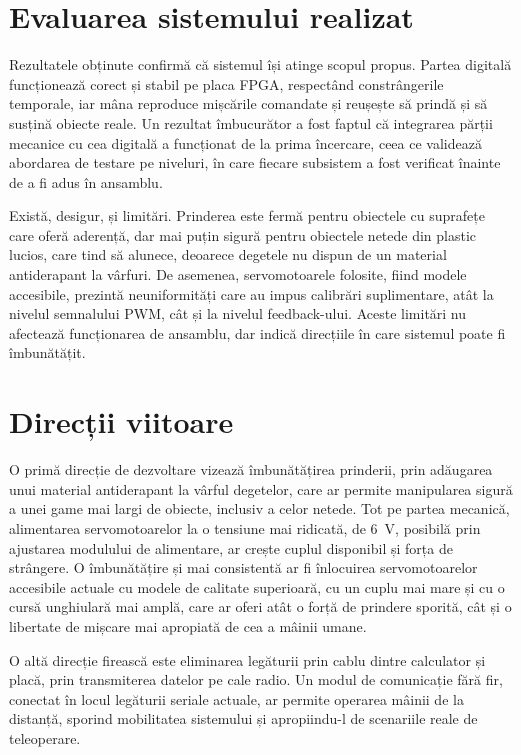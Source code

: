 \section{Evaluarea sistemului realizat}
\label{sec:concluzii-analiza}

Rezultatele obținute confirmă că sistemul își atinge scopul propus. Partea digitală
funcționează corect și stabil pe placa FPGA, respectând constrângerile temporale, iar
mâna reproduce mișcările comandate și reușește să prindă și să susțină obiecte reale.
Un rezultat îmbucurător a fost faptul că integrarea părții mecanice cu cea digitală a
funcționat de la prima încercare, ceea ce validează abordarea de testare pe niveluri,
în care fiecare subsistem a fost verificat înainte de a fi adus în ansamblu.

Există, desigur, și limitări. Prinderea este fermă pentru obiectele cu suprafețe care
oferă aderență, dar mai puțin sigură pentru obiectele netede din plastic lucios, care
tind să alunece, deoarece degetele nu dispun de un material antiderapant la vârfuri. De
asemenea, servomotoarele folosite, fiind modele accesibile, prezintă neuniformități care
au impus calibrări suplimentare, atât la nivelul semnalului PWM, cât și la nivelul
feedback-ului. Aceste limitări nu afectează funcționarea de ansamblu, dar indică
direcțiile în care sistemul poate fi îmbunătățit.

\section{Direcții viitoare}
\label{sec:concluzii-dezvoltare}

O primă direcție de dezvoltare vizează îmbunătățirea prinderii, prin adăugarea unui
material antiderapant la vârful degetelor, care ar permite manipularea sigură a unei
game mai largi de obiecte, inclusiv a celor netede. Tot pe partea mecanică, alimentarea
servomotoarelor la o tensiune mai ridicată, de 6~V, posibilă prin ajustarea modulului de
alimentare, ar crește cuplul disponibil și forța de strângere. O îmbunătățire și mai
consistentă ar fi înlocuirea servomotoarelor accesibile actuale cu modele de calitate
superioară, cu un cuplu mai mare și cu o cursă unghiulară mai amplă, care ar oferi atât
o forță de prindere sporită, cât și o libertate de mișcare mai apropiată de cea a mâinii
umane.

O altă direcție firească este eliminarea legăturii prin cablu dintre calculator și placă,
prin transmiterea datelor pe cale radio. Un modul de comunicație fără fir, conectat în
locul legăturii seriale actuale, ar permite operarea mâinii de la distanță, sporind
mobilitatea sistemului și apropiindu-l de scenariile reale de teleoperare.

